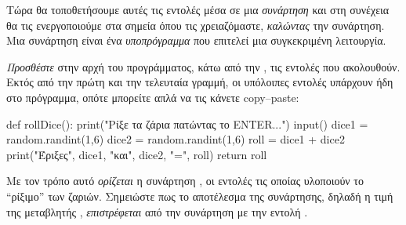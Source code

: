 \documentclass[a4paper,11pt,oneside]{book}
\begin{document}
\begin{step}
Τώρα θα τοποθετήσουμε αυτές τις εντολές μέσα σε μια \emph{συνάρτηση} και στη συνέχεια θα τις ενεργοποιούμε στα σημεία όπου τις χρειαζόμαστε, \emph{καλώντας} την συνάρτηση. Μια συνάρτηση είναι ένα \emph{υποπρόγραμμα} που επιτελεί μια συγκεκριμένη λειτουργία. 

\emph{Προσθέστε} στην αρχή του προγράμματος, κάτω από την , τις εντολές που ακολουθούν. Εκτός από την πρώτη και την τελευταία γραμμή, οι υπόλοιπες εντολές υπάρχουν ήδη στο πρόγραμμα, οπότε μπορείτε απλά να τις κάνετε copy--paste:

\clearpage
{}

\begin{pynew}
def rollDice():
    print("Ρίξε τα ζάρια πατώντας το ENTER...")
    input()
    dice1 = random.randint(1,6)
    dice2 = random.randint(1,6)
    roll = dice1 + dice2
    print("Έριξες", dice1, "και", dice2, "=", roll)
    return roll
\end{pynew}

Με τον τρόπο αυτό \emph{ορίζεται} η συνάρτηση , οι εντολές τις οποίας υλοποιούν το ``ρίξιμο'' των ζαριών.
Σημειώστε πως το αποτέλεσμα της συνάρτησης, δηλαδή η τιμή της μεταβλητής , \emph{επιστρέφεται} από την συνάρτηση με την εντολή .
\end{step}
\end{document}
